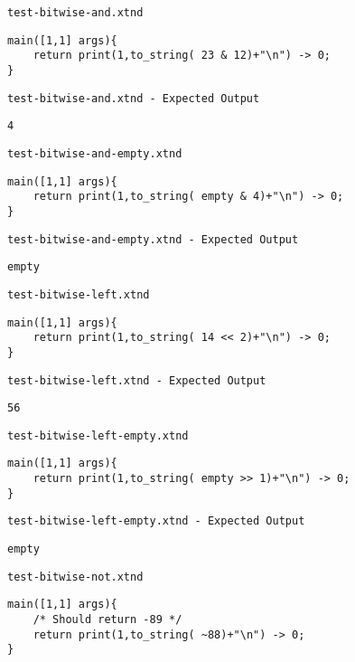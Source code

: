 \medskip \noindent \texttt{test-bitwise-and.xtnd}


\begin{lstlisting}
main([1,1] args){
	return print(1,to_string( 23 & 12)+"\n") -> 0;
}
\end{lstlisting}


\medskip \noindent \texttt{test-bitwise-and.xtnd - Expected Output}


\begin{lstlisting}
4
\end{lstlisting}


\medskip \noindent \texttt{test-bitwise-and-empty.xtnd}


\begin{lstlisting}
main([1,1] args){
	return print(1,to_string( empty & 4)+"\n") -> 0;
}
\end{lstlisting}


\medskip \noindent \texttt{test-bitwise-and-empty.xtnd - Expected Output}


\begin{lstlisting}
empty
\end{lstlisting}


\medskip \noindent \texttt{test-bitwise-left.xtnd}


\begin{lstlisting}
main([1,1] args){
	return print(1,to_string( 14 << 2)+"\n") -> 0;
}
\end{lstlisting}


\medskip \noindent \texttt{test-bitwise-left.xtnd - Expected Output}


\begin{lstlisting}
56
\end{lstlisting}


\medskip \noindent \texttt{test-bitwise-left-empty.xtnd}


\begin{lstlisting}
main([1,1] args){
	return print(1,to_string( empty >> 1)+"\n") -> 0;
}
\end{lstlisting}


\medskip \noindent \texttt{test-bitwise-left-empty.xtnd - Expected Output}


\begin{lstlisting}
empty
\end{lstlisting}


\medskip \noindent \texttt{test-bitwise-not.xtnd}


\begin{lstlisting}
main([1,1] args){
	/* Should return -89 */
	return print(1,to_string( ~88)+"\n") -> 0;
}
\end{lstlisting}


